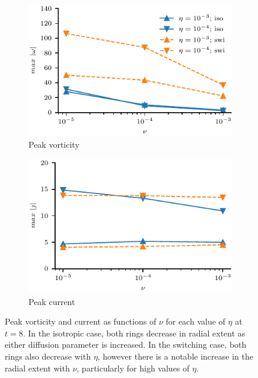 \begin{figure}[t]
    \begin{subfigure}{0.49\textwidth}
      \centering
  \includegraphics[width=1.0\linewidth]{param_study/peak_vort.pdf}
      \caption{Peak vorticity}%
      \label{fig:peak_vort}
    \end{subfigure}
    \hfill
    \begin{subfigure}{0.49\textwidth}
      \centering
  \includegraphics[width=1.0\linewidth]{param_study/peak_current.pdf}
      \caption{Peak current}%
      \label{fig:peak_current}
    \end{subfigure}
  \caption{Peak vorticity and current as functions of $\nu$ for each value of $\eta$ at $t=8$. In the isotropic case, both rings decrease in radial extent as either diffusion parameter is increased. In the switching case, both rings also decrease with $\eta$, however there is a notable increase in the radial extent with $\nu$, particularly for high values of $\eta$.}%
  \label{fig:param_study_peak_mag_and_loc}
\end{figure}

